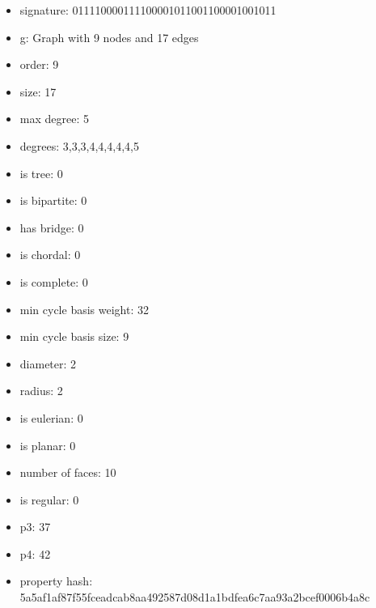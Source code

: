 \newpage
\begin{figure}
\end{figure}
\begin{itemize}
\item signature: 011110000111100001011001100001001011
\item g: Graph with 9 nodes and 17 edges
\item order: 9
\item size: 17
\item max degree: 5
\item degrees: 3,3,3,4,4,4,4,4,5
\item is tree: 0
\item is bipartite: 0
\item has bridge: 0
\item is chordal: 0
\item is complete: 0
\item min cycle basis weight: 32
\item min cycle basis size: 9
\item diameter: 2
\item radius: 2
\item is eulerian: 0
\item is planar: 0
\item number of faces: 10
\item is regular: 0
\item p3: 37
\item p4: 42
\item property hash: 5a5af1af87f55fceadcab8aa492587d08d1a1bdfea6c7aa93a2bcef0006b4a8c
\end{itemize}
